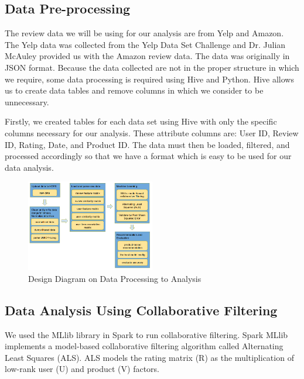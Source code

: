 \documentclass[conference]{IEEEtran}
\begin{document}
\subsection{Data Pre-processing}

The review data we will be using for our analysis are from Yelp and Amazon.  The Yelp data was collected from the Yelp Data Set Challenge and Dr. Julian McAuley provided us with the Amazon review data.  The data was originally in JSON format.  Because the data collected are not in the proper structure in which we require, some data processing is required using Hive and Python.  Hive allows us to create data tables and remove columns in which we consider to be unnecessary.

Firstly, we created tables for each data set using Hive with only the specific columns necessary for our analysis. These  attribute columns are: User ID, Review ID, Rating, Date, and Product ID. The data must then be loaded, filtered, and processed accordingly so that we have a format which is easy to be used for our data analysis.

\begin{figure}[h]
\centering
\includegraphics[width=0.5\textwidth]{image/design_v2}
\caption{Design Diagram on Data Processing to Analysis}
\end{figure}

\subsection{Data Analysis Using Collaborative Filtering}

We used the MLlib library in Spark to run collaborative filtering. Spark MLlib implements a model-based collaborative filtering algorithm called Alternating Least Squares (ALS). ALS models the rating matrix (R) as the multiplication of low-rank user (U) and product (V) factors.  

\end{document}
